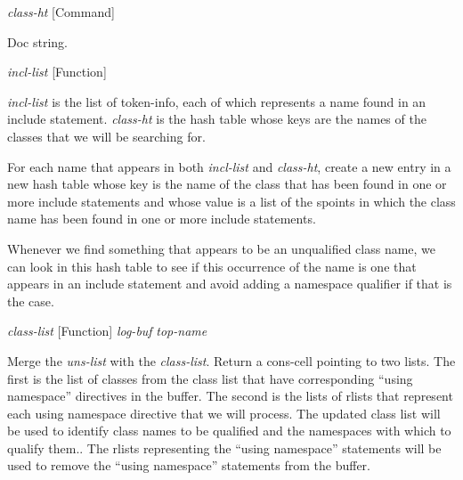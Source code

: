 \vspace{1em}
\noindent
{}
\usebox{\funcname}\emph{class-ht}
 \hfill [Command]

\begin{doc-string}
Doc string.
\end{doc-string}

\vspace{1em}
\noindent
{}
\usebox{\funcname}\emph{incl-list}
 \hfill [Function]
\hspace*{\wd\funcname}

\begin{doc-string}
\emph{incl-list} is the list of token-info, each of which represents a name found in
an include statement.  \emph{class-ht} is the hash table whose keys are the names of
the classes that we will be searching for.

For each name that appears in both \emph{incl-list} and \emph{class-ht}, create a new entry in
a new hash table whose key is the name of the class that has been found in one
or more include statements and whose value is a list of the spoints in which the
class name has been found in one or more include statements.

Whenever we find something that appears to be an unqualified class name, we can
look in this hash table to see if this occurrence of the name is one that
appears in an include statement and avoid adding a namespace qualifier if that
is the case.
\end{doc-string}

\vspace{1em}
\noindent
{}
\usebox{\funcname}\emph{class-list}
 \hfill [Function]
\hspace*{\wd\funcname}\emph{log-buf}
\hspace*{\wd\funcname}\emph{top-name}

\begin{doc-string}
Merge the \emph{uns-list} with the \emph{class-list}.  Return a cons-cell pointing to two
lists.  The first is the list of classes from the class list that have
corresponding ``using namespace'' directives in the buffer.  The second is the
lists of rlists that represent each using namespace directive that we will
process.
The updated class list will be used to identify class names to be qualified and
the namespaces with which to qualify them..  The rlists representing the ``using
namespace'' statements will be used to remove the ``using namespace'' statements
from the buffer.
\end{doc-string}

